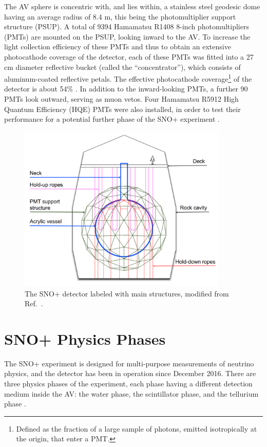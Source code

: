 The AV sphere is concentric with, and lies within, a stainless steel geodesic dome having an average radius of 8.4 m, this being the photomultiplier support structure (PSUP). A total of 9394 Hamamatsu R1408 8-inch photomultipliers (PMTs) are mounted on the PSUP, looking inward to the AV. To increase the light collection efficiency of these PMTs and thus to obtain an extensive photocathode coverage of the detector, each of these PMTs was fitted into a 27 cm diameter reflective bucket (called the ``concentrator''), which consists of aluminum-coated reflective petals. The effective photocathode coverage\footnote{Defined as the fraction of a large sample of photons, emitted isotropically at the origin, that enter a PMT.} of the detector is about 54\% \cite{whitepaper}. In addition to the inward-looking PMTs, a further 90 PMTs look outward, serving as muon vetos. Four Hamamatsu R5912 High Quantum Efficiency (HQE) PMTs were also installed, in order to test their performance for a potential further phase of the SNO+ experiment \cite{stringer2019sensitivity}.

\begin{figure}[htbp]
	\centering
	\includegraphics[width=10cm]{SNOPdetector.png}
	\caption[The SNO+ detector labeled with main structures.]{The SNO+ detector labeled with main structures, modified from Ref.~\cite{jones2011background}.}
	\label{snopdetector}
\end{figure}

\section{SNO+ Physics Phases}\label{sect:physicsPhase}

The SNO+ experiment is designed for multi-purpose measurements of neutrino physics, and the detector has been in operation since December 2016. There are three physics phases of the experiment, each phase having a different detection medium inside the AV: the water phase, the scintillator phase, and the tellurium phase \cite{whitepaper}. 


